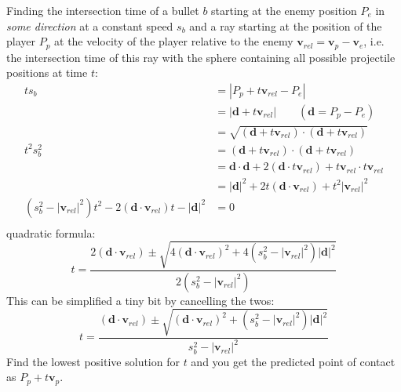 \documentclass{article}
\title{}
\author{Mikael Myyrä}
\date{}
\begin{document}
Finding the intersection time of a bullet $b$ starting at the enemy
position $P_e$ in \textit{some direction} at a constant speed $s_b$ and a ray starting
at the position of the player $P_p$ at the velocity of the player relative to
the enemy $\mathbf{v}_{rel} = \mathbf{v}_p - \mathbf{v}_e$, i.e. the
intersection time of this ray with the sphere containing all possible
projectile positions at time $t$:
\begin{align*}
  ts_b &= |P_p + t\mathbf{v}_{rel} - P_e| \\
       &= |\mathbf{d} + t\mathbf{v}_{rel}| \qquad (\mathbf{d} = P_p - P_e) \\
       &= \sqrt{(\mathbf{d} + t\mathbf{v}_{rel}) \cdot (\mathbf{d} + t\mathbf{v}_{rel})} \\
  t^2s_b^2 &= (\mathbf{d} + t\mathbf{v}_{rel}) \cdot (\mathbf{d} + t\mathbf{v}_{rel}) \\
           &= \mathbf{d} \cdot \mathbf{d} + 2(\mathbf{d} \cdot t\mathbf{v}_{rel}) + t\mathbf{v}_{rel} \cdot t\mathbf{v}_{rel} \\
           &= |\mathbf{d}|^2 + 2t(\mathbf{d} \cdot \mathbf{v}_{rel}) + t^2|\mathbf{v}_{rel}|^2 \\
  (s_b^2 - |\mathbf{v}_{rel}|^2)t^2 - 2(\mathbf{d} \cdot \mathbf{v}_{rel})t - |\mathbf{d}|^2 &= 0 \\
\end{align*}
 quadratic formula:
 \[
   t = \frac{2(\mathbf{d} \cdot \mathbf{v}_{rel}) \pm \sqrt{4(\mathbf{d} \cdot \mathbf{v}_{rel})^2
   + 4(s_b^2 - |\mathbf{v}_{rel}|^2) |\mathbf{d}|^2}}{2(s_b^2 - |\mathbf{v}_{rel}|^2)}
 \]
This can be simplified a tiny bit by cancelling the twos:
\[
   t = \frac{(\mathbf{d} \cdot \mathbf{v}_{rel}) \pm \sqrt{(\mathbf{d} \cdot \mathbf{v}_{rel})^2
   + (s_b^2 - |\mathbf{v}_{rel}|^2) |\mathbf{d}|^2}}{s_b^2 - |\mathbf{v}_{rel}|^2}
\]
Find the lowest positive solution for $t$ and you get the predicted point of contact as
$P_p + t\mathbf{v}_p$.
\end{document}
